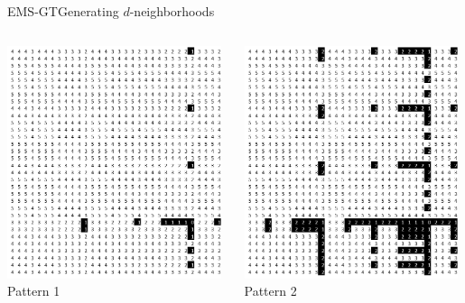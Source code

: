 \documentclass[pdf,xcolor={dvipsnames}]{beamer}
\begin{document}
\begin{frame}{EMS-GT}{Generating $d$-neighborhoods}
\begin{itemize}
{\begin{columns}
			\begin{column}{.135\textwidth}\centering\includegraphics[width=0.98\textwidth]{img/1}\\Pattern 1 \end{column}
			\begin{column}{.135\textwidth}\centering\includegraphics[width=0.98\textwidth]{img/2}\\Pattern 2 \end{column}

\end{columns}}
\end{itemize}
\end{frame}
\end{document}
